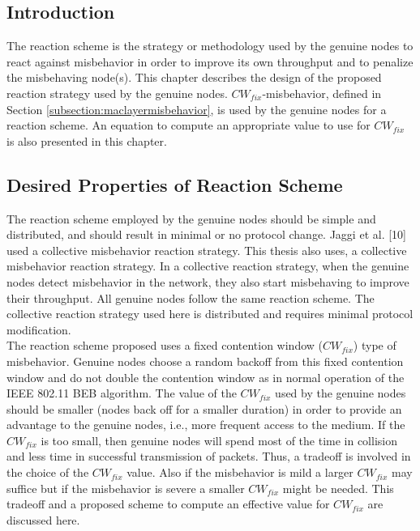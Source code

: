 \documentclass[12pt,letterpaper,english]{article}
\begin{document}
\subsection{Introduction}
\indent The reaction scheme is the strategy or methodology used by the genuine nodes to react against misbehavior in order to improve its own throughput and to penalize the misbehaving node(s). This chapter describes the design of the proposed reaction strategy used by the genuine nodes. $CW_{fix}$-misbehavior, defined in Section \ref{subsection:maclayermisbehavior}, is used by the genuine nodes for a reaction scheme. An equation to compute an appropriate value to use for $CW_{fix}$ is also presented in this chapter.
\subsection{Desired Properties of Reaction Scheme}
\label{subsection:propertiesofreaction}
\indent The reaction scheme employed by the genuine nodes should be simple and distributed, and should result in minimal or no protocol change. 
Jaggi et al. 
[10] 
used a collective misbehavior reaction strategy. This thesis also uses, a collective misbehavior reaction strategy.
In a collective reaction strategy, when the genuine nodes detect misbehavior in the network, they also start misbehaving to improve their throughput. All genuine nodes follow the same reaction scheme.
The collective reaction strategy used here is distributed and requires minimal protocol modification.\\
\indent The reaction scheme proposed uses a fixed contention window ($CW_{fix}$) type of misbehavior. Genuine nodes choose a random backoff from this fixed contention window and do not double the contention window as in normal operation of the IEEE 802.11 BEB algorithm. The value of the $CW_{fix}$ used by the genuine nodes should be smaller (nodes back off for a smaller duration) in order to provide an advantage to the genuine nodes, i.e., more frequent access to the medium. If the $CW_{fix}$ is too small, then genuine nodes will spend most of the time in collision and less time in successful transmission of packets. Thus, a tradeoff is involved in the choice of the $CW_{fix}$ value. Also if the misbehavior is mild a larger $CW_{fix}$ may suffice but if the misbehavior is severe a smaller $CW_{fix}$ might be needed. This tradeoff and a proposed scheme to compute an effective value for $CW_{fix}$ are discussed here.
\end{document}
